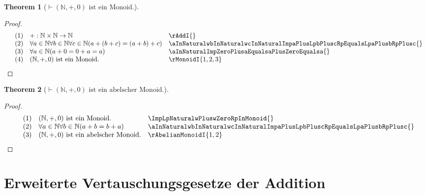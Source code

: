 \documentclass{book}
\theoremstyle{plain}
\newtheorem{theorem}{Theorem}
\theoremstyle{remark}
\theoremstyle{definition}
\begin{document}
\label{ImpLpNaturalwPluswZeroRpInMonoid}
\begin{theorem}[\(\vdash (\mathbb{N},+,0) \text{ ist ein Monoid.}\)]
\end{theorem}
\begin{proof}
        \[
	\begin{array}{llll}
                &  (1) & +:\mathbb{N}\times\mathbb{N}\rightarrow\mathbb{N} & \rAddI{} \\
                &  (2) & \forall a\in\mathbb{N}\forall b\in\mathbb{N}\forall c\in\mathbb{N}(a+(b+c)=(a+b)+c) & \aInNaturalwbInNaturalwcInNaturalImpaPlusLpbPluscRpEqualsLpaPlusbRpPlusc{} \\
                &  (3) & \forall a\in\mathbb{N}(a+0=0+a=a) & \aInNaturalImpZeroPlusaEqualsaPlusZeroEqualsa{} \\
                &  (4) & (\mathbb{N},+,0) \text{ ist ein Monoid.} & \rMonoidI{1,2,3} \\
	\end{array}
	\]
\end{proof}

\label{ImpLpNaturalwPluswZeroRpInAbelMonoid}
\begin{theorem}[\(\vdash (\mathbb{N},+,0) \text{ ist ein abelscher Monoid.}\)]
\end{theorem}
\begin{proof}
        \[
	\begin{array}{llll}
                &  (1) & (\mathbb{N},+,0) \text{ ist ein Monoid.} & \ImpLpNaturalwPluswZeroRpInMonoid{} \\
                &  (2) & \forall a\in\mathbb{N}\forall b\in\mathbb{N}(a+b=b+a) & \aInNaturalwbInNaturalwcInNaturalImpaPlusLpbPluscRpEqualsLpaPlusbRpPlusc{} \\
                &  (3) & (\mathbb{N},+,0) \text{ ist ein abelscher Monoid.} & \rAbelianMonoidI{1,2} \\
	\end{array}
	\]
\end{proof}

\section{Erweiterte Vertauschungsgesetze der Addition}
\end{document}
